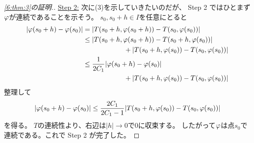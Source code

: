\documentclass[report]{jlreq}
\begin{document}
\begin{proof}[\cref{6:thm:3}の証明.]
    \underline{Step 2:}
    次に(3)を示していきたいのだが、
    Step 2 ではひとまず$\varphi$が連続であることを示そう。
    $s_0, s_0 + h \in I$を任意にとると
    \begin{equation}
        \begin{split}
            |\varphi(s_0 + h) - \varphi(s_0)|
                &= |T(s_0 + h, \varphi(s_0 + h)) - T(s_0, \varphi(s_0))| \\
                &\le |T(s_0 + h, \varphi(s_0 + h)) - T(s_0 + h, \varphi(s_0))| \\
                &\hspace{6em} + |T(s_0 + h, \varphi(s_0)) - T(s_0, \varphi(s_0))| \\
                &\le \frac{1}{2C_1} |\varphi(s_0 + h) - \varphi(s_0)| \\
                &\hspace{6em} + |T(s_0 + h, \varphi(s_0)) - T(s_0, \varphi(s_0))|
        \end{split}
    \end{equation}
    整理して
    \begin{equation}
        |\varphi(s_0 + h) - \varphi(s_0)|
            \le \frac{2C_1}{2C_1 - 1} |T(s_0 + h, \varphi(s_0)) - T(s_0, \varphi(s_0))|
    \end{equation}
    を得る。
    $T$の連続性より、右辺は$|h| \to 0$で$0$に収束する。
    したがって$\varphi$は点$s_0$で連続である。これで Step 2 が完了した。


\end{proof}
\end{document}
